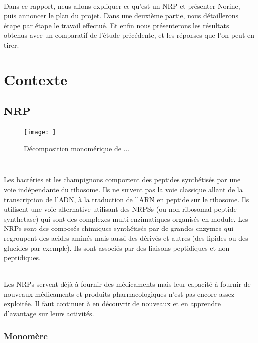 \documentclass[a4paper,10pt]{report}
\begin{document}
     
      ~~\\Dans ce rapport, nous allons expliquer ce qu'est un NRP et présenter Norine, puis annoncer le plan du projet. Dans une deuxième partie, nous détaillerons étape par étape le travail effectué. Et enfin nous présenterons les résultats obtenus avec un comparatif de l'étude précédente, et les réponses que l'on peut en tirer.
     
      \newpage


  \chapter{Contexte}

    
    \section{NRP}
      \begin{figure}[h]
	\caption{Décomposition monomérique de ...}
	\texttt{[image: ]}
      \end{figure}
      \paragraph{}
	~\\ 
	Les bactéries et les champignons comportent des peptides synthétisés par une voie indépendante du ribosome. 
	Ils ne suivent pas la voie classique allant de la transcription de l'ADN, à la traduction de l'ARN en peptide sur le ribosome.
	Ils utilisent une voie alternative utilisant des NRPSs (ou non-ribosomal peptide synthetase) qui sont des complexes multi-enzimatiques organisés en module.
	Les NRPs sont des composés chimiques synthétisés par de grandes enzymes qui regroupent des acides aminés mais aussi des dérivés et autres (des lipides ou des glucides par exemple). Ils sont associés par des liaisons peptidiques et non peptidiques. 
	
	\\Les NRPs servent déjà à fournir des médicaments mais leur capacité à fournir de nouveaux médicaments et produits pharmacologiques n'est pas encore assez exploitée. Il faut continuer à en découvrir de nouveaux et en apprendre d'avantage sur leurs activités.

      \subsection{Monomère}
	
\end{document}
